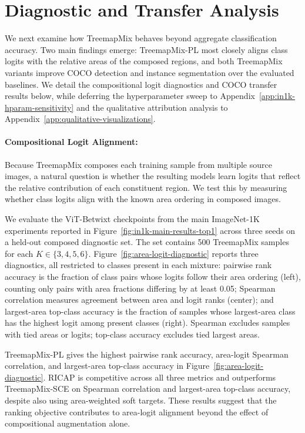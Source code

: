 \section{Diagnostic and Transfer Analysis}
We next examine how TreemapMix behaves beyond aggregate classification
accuracy. Two main findings emerge: TreemapMix-PL most closely aligns class
logits with the relative areas of the composed regions, and both TreemapMix
variants improve COCO detection and instance segmentation over the evaluated
baselines. We detail the compositional logit diagnostics and COCO transfer
results below, while deferring the hyperparameter sweep to
Appendix~\ref{app:in1k-hparam-sensitivity} and the qualitative attribution
analysis to Appendix~\ref{app:qualitative-visualizations}.

\paragraph{Compositional Logit Alignment:}\label{sec:logit-alignment}
Because TreemapMix composes each training sample from multiple source images, a
natural question is whether the resulting models learn logits that reflect the
relative contribution of each constituent region. We test this by measuring
whether class logits align with the known area ordering in composed images.

We evaluate the ViT-Betwixt checkpoints from the main ImageNet-1K
experiments reported in Figure~\ref{fig:in1k-main-results-top1} across three
seeds on a held-out composed diagnostic set. The set contains 500 TreemapMix
samples for each
$K \in \{3,4,5,6\}$. Figure~\ref{fig:area-logit-diagnostic} reports three
diagnostics, all restricted to classes present in each mixture: pairwise rank
accuracy is the fraction of class pairs whose logits follow their area ordering
(left), counting only pairs with area fractions differing by at least 0.05;
Spearman correlation measures agreement between area and logit ranks (center);
and largest-area top-class accuracy is the fraction of samples whose largest-area
class has the highest logit among present classes (right). Spearman excludes
samples with tied areas or logits; top-class accuracy excludes tied largest areas.



TreemapMix-PL gives the highest pairwise rank accuracy, area-logit Spearman
correlation, and largest-area top-class accuracy in
Figure~\ref{fig:area-logit-diagnostic}. RICAP is competitive across all three
metrics and outperforms TreemapMix-SCE on Spearman correlation and
largest-area top-class accuracy, despite also using area-weighted soft targets.
These results suggest that the ranking objective contributes to area-logit
alignment beyond the effect of compositional augmentation alone.

